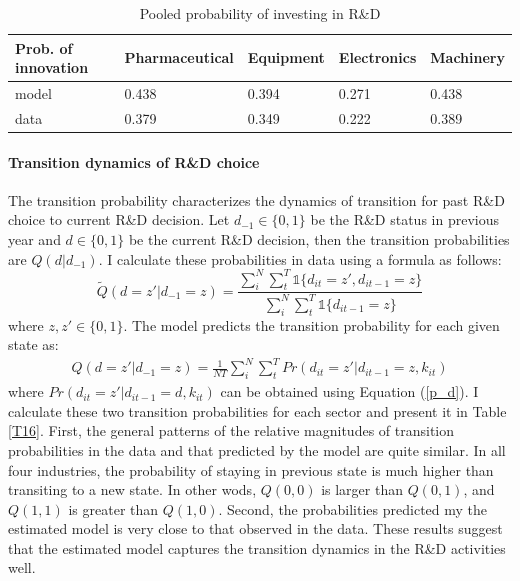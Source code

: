 \documentclass[English]{article}
\begin{document}
\begin{table}[H]
\centering
\caption{Pooled probability of investing in R\&D}
\label{T15}
\begin{tabular}{lllll}
\hline\hline
Prob. of innovation & Pharmaceutical & Equipment & Electronics & Machinery \\
\hline
model & 0.438 & 0.394 & 0.271 & 0.438 \\
data  & 0.379 & 0.349 & 0.222 & 0.389 \\  
\hline\hline
\end{tabular}
\end{table}

\paragraph{Transition dynamics of R\&D choice}
The transition probability characterizes the dynamics of transition for past R\&D choice to current R\&D decision. Let $d_{-1}\in\{0,1\}$ be the R\&D status in previous year and $d\in\{0,1\}$ be the current R\&D decision, then the transition probabilities are $Q(d|d_{-1})$. I calculate these probabilities in data using a formula as follows:
\begin{equation}
\tilde Q(d=z'|d_{-1}=z)=\frac{\sum_{i}^{N}\sum_{t}^{T} \mathbb{1}\{d_{it}=z',d_{it-1}=z\}}{\sum_{i}^{N}\sum_{t}^{T} \mathbb{1}\{d_{it-1}=z\}}
\end{equation}
where $z,z'\in\{0,1\}$. The model predicts the transition probability for each given state as:
\begin{align}
Q(d=z'|d_{-1}=z)=\frac{1}{NT}\sum_{i}^N\sum_{t}^T Pr(d_{it}=z'|d_{it-1}=z,k_{it})
\end{align}
where $Pr(d_{it}=z'|d_{it-1}=d,k_{it})$ can be obtained using Equation (\ref{p_d}). I calculate these two transition probabilities for each sector and present it in Table \ref{T16}. First, the general patterns of the relative magnitudes of transition probabilities in the data and that predicted by the model are quite similar. In all four industries, the probability of staying in previous state is much higher than transiting to a new state. In other wods, $Q(0,0)$ is larger than $Q(0,1)$, and $Q(1,1)$ is greater than $Q(1,0)$. Second, the probabilities predicted my the estimated model is very close to that observed in the data. These results suggest that the estimated model captures the transition dynamics in the R\&D activities well. 
\end{document}
